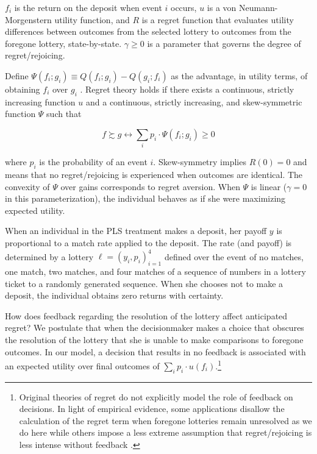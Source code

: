 \documentclass[12pt, titlepage]{article}
\begin{document}
	$f_i$ is the return on the deposit when event $i$ occurs, $u$ is a von Neumann-Morgenstern utility function, and $R$ is a regret function that evaluates utility differences between outcomes from the selected lottery to outcomes from the foregone lottery, state-by-state. $\gamma \geq 0$ is a parameter that governs the degree of regret/rejoicing.

	Define $\Psi(f_i; g_i) \equiv Q(f_i; g_i) - Q(g_i; f_i)$ as the advantage, in utility terms, of obtaining $f_i$ over $g_i$ . Regret theory holds if there exists a continuous, strictly increasing function $u$ and a continuous, strictly increasing, and skew-symmetric function $\Psi$ such that

		\[ f \succsim g \leftrightarrow \sum_{i} p_{i} \cdot \Psi (f_i; g_i) \geq 0 \]

	\noindent where $p_i$ is the probability of an event $i$. Skew-symmetry implies $R(0) = 0$ and means that no regret/rejoicing is experienced when outcomes are identical. The convexity of $\Psi$ over gains corresponds to regret aversion. When $\Psi$ is linear ($\gamma = 0$ in this parameterization), the individual behaves as if she were maximizing expected utility.

	When an individual in the PLS treatment makes a deposit, her payoff $y$ is proportional to a match rate applied to the deposit. The rate (and payoff) is determined by a lottery $\ell = (y_i, p_i)_{i=1}^{4}$ defined over the event of no matches, one match, two matches, and four matches of a sequence of numbers in a lottery ticket to a randomly generated sequence. When she chooses not to make a deposit, the individual obtains zero returns with certainty.

	How does feedback regarding the resolution of the lottery affect anticipated regret? We postulate that when the decisionmaker makes a choice that obscures the resolution of the lottery that she is unable to make comparisons to foregone outcomes. In our model, a decision that results in no feedback is associated with an expected utility over final outcomes of $\sum_{i} p_{i} \cdot u(f_i)$.\footnote{Original theories of regret \parencite{loomes_regret_1982,bell_risk_1983} do not explicitly model the role of feedback on decisions. In light of empirical evidence, some applications disallow the calculation of the regret term when foregone lotteries remain unresolved as we do here \parencite{strack_too_2019,filiz-ozbay_auctions_2007} while others impose a less extreme assumption that regret/rejoicing is less intense without feedback \parencite{somasundaram_regret_2017,humphrey_feedback-conditional_2004}.}
\end{document}
